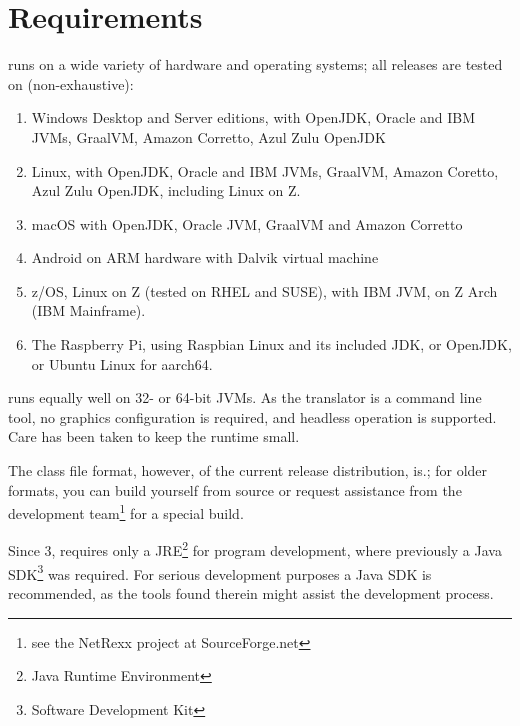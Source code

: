 \chapter{Requirements}
\nr{}  runs on a wide variety of
hardware and operating systems; all releases are tested on (non-exhaustive):
\begin{enumerate}
\item Windows Desktop and Server editions, with OpenJDK, Oracle and
  IBM JVMs, GraalVM, Amazon Corretto, Azul Zulu OpenJDK
\item Linux, with OpenJDK, Oracle and IBM JVMs, GraalVM, Amazon
  Coretto, Azul Zulu OpenJDK, including Linux on Z.
\item macOS with OpenJDK,  Oracle JVM, GraalVM and Amazon Corretto
\item Android on ARM hardware with Dalvik virtual machine
\item z/OS, Linux on Z (tested on RHEL and SUSE), with IBM JVM, on Z
  Arch (IBM Mainframe).
\item The Raspberry Pi, using Raspbian Linux and its included JDK, or
  OpenJDK, or Ubuntu Linux for aarch64.
\end{enumerate}
\nr{} runs equally well on 32- or 64-bit JVMs. As the translator is
a command line tool, no graphics configuration is required, and
headless operation is supported. Care has been taken to keep the \nr{} runtime small.

The class file format, however, of the current release distribution,
is.; for older formats, you
can build \nr{} yourself from source or request assistance from the development
team\footnote{see the NetRexx project at SourceForge.net} for a special build.
\begin{shaded}\noindent
Since \nr{} 3, \nr{} requires only a
JRE\footnote{Java Runtime Environment} for program development, where previously a
Java SDK\footnote{Software Development Kit} was required. For serious development
purposes a Java SDK is recommended, as the tools found therein might
assist the development process.
\end{shaded}\indent


